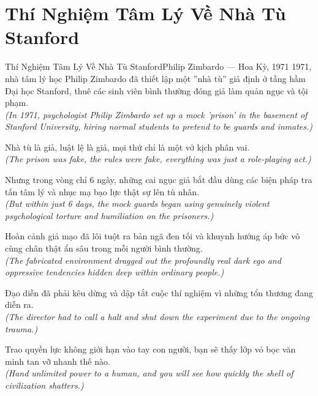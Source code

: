 \section{Thí Nghiệm Tâm Lý Về Nhà Tù Stanford}
\begin{truyen}{Thí Nghiệm Tâm Lý Về Nhà Tù Stanford}{Philip Zimbardo --- Hoa Kỳ, 1971}
 1971, nhà tâm lý học Philip Zimbardo đã thiết lập một ''nhà tù'' giả định ở tầng hầm Đại học Stanford, thuê các sinh viên bình thường đóng giả làm quản ngục và tội phạm.\\[4pt]
\textit{(In 1971, psychologist Philip Zimbardo set up a mock 'prison' in the basement of Stanford University, hiring normal students to pretend to be guards and inmates.)}

Nhà tù là giả, luật lệ là giả, mọi thứ chỉ là một vở kịch phân vai.\\[4pt]
\textit{(The prison was fake, the rules were fake, everything was just a role-playing act.)}

Nhưng trong vòng chỉ 6 ngày, những cai ngục giả bắt đầu dùng các biện pháp tra tấn tâm lý và nhục mạ bạo lực thật sự lên tù nhân.\\[4pt]
\textit{(But within just 6 days, the mock guards began using genuinely violent psychological torture and humiliation on the prisoners.)}

Hoàn cảnh giả mạo đã lôi tuột ra bản ngã đen tối và khuynh hướng áp bức vô cùng chân thật ẩn sâu trong mỗi người bình thường.\\[4pt]
\textit{(The fabricated environment dragged out the profoundly real dark ego and oppressive tendencies hidden deep within ordinary people.)}

Đạo diễn đã phải kêu dừng và dập tắt cuộc thí nghiệm vì những tổn thương đang diễn ra.\\[4pt]
\textit{(The director had to call a halt and shut down the experiment due to the ongoing trauma.)}

\end{truyen}
\begin{baihoc}
  Trao quyền lực không giới hạn vào tay con người, bạn sẽ thấy lớp vỏ bọc văn minh tan vỡ nhanh thế nào.\\[4pt]
  \textit{(Hand unlimited power to a human, and you will see how quickly the shell of civilization shatters.)}
\end{baihoc}

